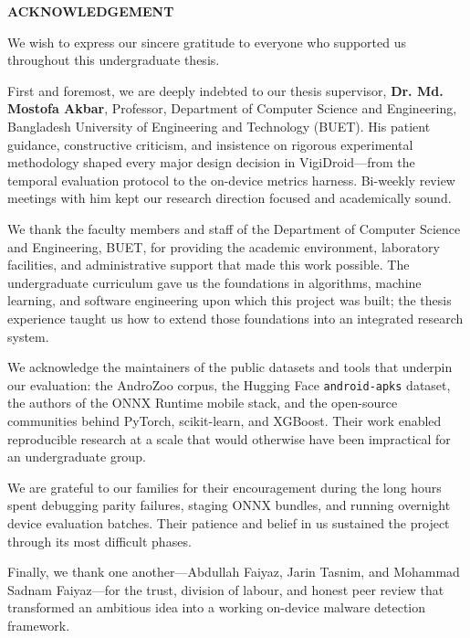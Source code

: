 \begin{center}
  \textbf{{\Large ACKNOWLEDGEMENT}}\\[60pt]
\end{center}

We wish to express our sincere gratitude to everyone who supported us throughout this undergraduate thesis.

First and foremost, we are deeply indebted to our thesis supervisor, \textbf{Dr. Md. Mostofa Akbar}, Professor, Department of Computer Science and Engineering, Bangladesh University of Engineering and Technology (BUET). His patient guidance, constructive criticism, and insistence on rigorous experimental methodology shaped every major design decision in VigiDroid---from the temporal evaluation protocol to the on-device metrics harness. Bi-weekly review meetings with him kept our research direction focused and academically sound.

We thank the faculty members and staff of the Department of Computer Science and Engineering, BUET, for providing the academic environment, laboratory facilities, and administrative support that made this work possible. The undergraduate curriculum gave us the foundations in algorithms, machine learning, and software engineering upon which this project was built; the thesis experience taught us how to extend those foundations into an integrated research system.

We acknowledge the maintainers of the public datasets and tools that underpin our evaluation: the AndroZoo corpus, the Hugging Face \texttt{android-apks} dataset, the authors of the ONNX Runtime mobile stack, and the open-source communities behind PyTorch, scikit-learn, and XGBoost. Their work enabled reproducible research at a scale that would otherwise have been impractical for an undergraduate group.

We are grateful to our families for their encouragement during the long hours spent debugging parity failures, staging ONNX bundles, and running overnight device evaluation batches. Their patience and belief in us sustained the project through its most difficult phases.

Finally, we thank one another---Abdullah Faiyaz, Jarin Tasnim, and Mohammad Sadnam Faiyaz---for the trust, division of labour, and honest peer review that transformed an ambitious idea into a working on-device malware detection framework.

